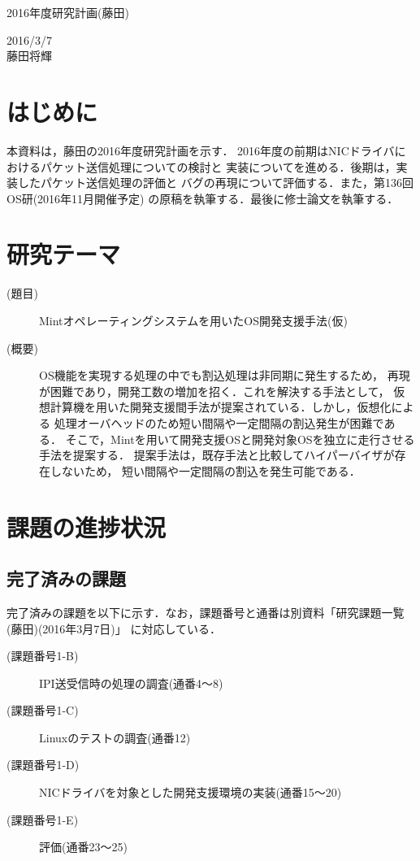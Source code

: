 \documentclass[12pt]{jsarticle}
\begin{document}

\begin{center}
    {\LARGE 2016年度研究計画(藤田)}
\end{center}

\begin{flushright}
    2016/3/7\\
    藤田将輝
\end{flushright}
\section{はじめに}
本資料は，藤田の2016年度研究計画を示す．
2016年度の前期はNICドライバにおけるパケット送信処理についての検討と
実装についてを進める．後期は，実装したパケット送信処理の評価と
バグの再現について評価する．また，第136回OS研(2016年11月開催予定)
の原稿を執筆する．最後に修士論文を執筆する．

\section{研究テーマ}
\begin{description}
    \item[(題目)]Mintオペレーティングシステムを用いたOS開発支援手法(仮)
    \item[(概要)]OS機能を実現する処理の中でも割込処理は非同期に発生するため，
        再現が困難であり，開発工数の増加を招く．これを解決する手法として，
        仮想計算機を用いた開発支援間手法が提案されている．しかし，仮想化による
        処理オーバヘッドのため短い間隔や一定間隔の割込発生が困難である．
        そこで，Mintを用いて開発支援OSと開発対象OSを独立に走行させる手法を提案する．
        提案手法は，既存手法と比較してハイパーバイザが存在しないため，
        短い間隔や一定間隔の割込を発生可能である．
\end{description}

\section{課題の進捗状況}
\subsection{完了済みの課題}
完了済みの課題を以下に示す．なお，課題番号と通番は別資料「研究課題一覧(藤田)(2016年3月7日)」
に対応している．
\begin{description}
    \item[(課題番号1-B)]IPI送受信時の処理の調査(通番4〜8)
    \item[(課題番号1-C)]Linuxのテストの調査(通番12)
    \item[(課題番号1-D)]NICドライバを対象とした開発支援環境の実装(通番15〜20)
    \item[(課題番号1-E)]評価(通番23〜25)
\end{description}
\end{document}
